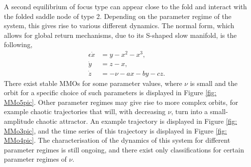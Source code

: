 A second equilibrium of focus type can appear close to the fold and interact with the folded saddle node of type 2.
Depending on the parameter regime of the system, this gives rise to various different dynamics.
The normal form, which allows for global return mechanisms, due to its S-shaped slow manifold, is the following,
\begin{align*}
\epsilon \dot{x} &= y - x^2 - x^3, \\
\dot{y} &= z - x, \\
\dot{z} &= -\nu -ax -by -cz.
\end{align*}
There exist stable MMOs for some parameter values, where $\nu$ is small and the orbit for a specific choice of such parameters is displayed in Figure \ref{fig: MMo5pic}. Other parameter regimes may give rise to more complex orbits, for example chaotic trajectories that will, with decreasing $\nu$, turn into a small-amplitude chaotic attractor. An example trajectory is displayed in Figure \ref{fig: MMo3pic}, and the time series of this trajectory is displayed in Figure \ref{fig: MMo4pic}. The characterisation of the dynamics of this system for different parameter regimes is still ongoing, and there exist only classifications for certain parameter regimes of $\nu$.


